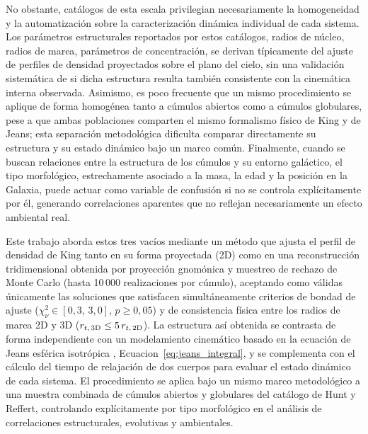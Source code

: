     No obstante, catálogos de esta escala privilegian necesariamente la 
    homogeneidad y la automatización sobre la caracterización dinámica 
    individual de cada sistema. Los parámetros estructurales reportados por 
    estos catálogos, radios de núcleo, radios de marea, parámetros de 
    concentración, se derivan típicamente del ajuste de perfiles de densidad 
    proyectados sobre el plano del cielo, sin una validación sistemática de si 
    dicha estructura resulta también consistente con la cinemática interna 
    observada. Asimismo, es poco frecuente que un mismo procedimiento se aplique 
    de forma homogénea tanto a cúmulos abiertos como a cúmulos globulares, pese 
    a que ambas poblaciones comparten el mismo formalismo físico de King y de 
    Jeans; esta separación metodológica dificulta comparar directamente su 
    estructura y su estado dinámico bajo un marco común. Finalmente, cuando se 
    buscan relaciones entre la estructura de los cúmulos y su entorno galáctico, 
    el tipo morfológico, estrechamente asociado a la masa, la edad y la posición 
    en la Galaxia, puede actuar como variable de confusión si no se controla 
    explícitamente por él, generando correlaciones aparentes que no reflejan 
    necesariamente un efecto ambiental real.

    Este trabajo aborda estos tres vacíos mediante un método que ajusta el 
    perfil de densidad de King \cite{king1962structure} tanto en su forma 
    proyectada (2D) como en una reconstrucción tridimensional obtenida por 
    proyección gnomónica y muestreo de rechazo de Monte Carlo (hasta 10\,000 
    realizaciones por cúmulo), aceptando como válidas únicamente las soluciones 
    que satisfacen simultáneamente criterios de bondad de ajuste ($\chi^2_\nu 
    \in [0{,}3,\,3{,}0]$, $p\geq0{,}05$) y de consistencia física entre los 
    radios de marea 2D y 3D ($r_{t,\, 3{\rm D}}\leq 5\,r_{t,\, 2{\rm D}}$). La 
    estructura así obtenida se contrasta de forma independiente con un 
    modelamiento cinemático basado en la ecuación de Jeans esférica isotrópica 
    \cite{Jeans1919}, Ecuacion~\eqref{eq:jeans_integral}, y se complementa con 
    el cálculo del tiempo de relajación de dos cuerpos \cite{Spitzer1987} para 
    evaluar el estado dinámico de cada sistema. El procedimiento se aplica bajo 
    un mismo marco metodológico a una muestra combinada de cúmulos abiertos y 
    globulares del catálogo de Hunt y Reffert, controlando explícitamente por 
    tipo morfológico en el análisis de correlaciones estructurales, evolutivas y 
    ambientales.


